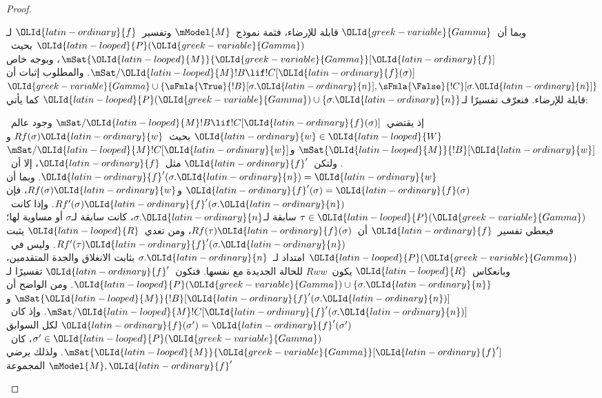 \documentclass[../../../include/open-logic-section]{subfiles}
\begin{document}
\begin{proof}
\begin{enumerate}
  وبما أن~$\OLId{greek-variable}{Gamma}$ قابلة للإرضاء، فثمة نموذج~$\mModel{M}$ وتفسير~$\OLId{latin-ordinary}{f}$
  لـ$\OLId{latin-looped}{P}(\OLId{greek-variable}{Gamma})$ بحيث~$\mSat{\OLId{latin-looped}{M}}{\OLId{greek-variable}{Gamma}}[\OLId{latin-ordinary}{f}]$، وبوجه خاص
  $\mSat/{\OLId{latin-looped}{M}}{!B \lif !C}[\OLId{latin-ordinary}{f}(\sigma)]$. والمطلوب إثبات أن
  $\OLId{greek-variable}{Gamma} \cup \{\sFmla{\True}{!B}[\sigma.\OLId{latin-ordinary}{n}],
  \sFmla{\False}{!C}[\sigma.\OLId{latin-ordinary}{n}]\}$ قابلة للإرضاء. فنعرّف
  تفسيرًا لـ$\OLId{latin-looped}{P}(\OLId{greek-variable}{Gamma}) \cup \{\sigma.\OLId{latin-ordinary}{n}\}$ كما يأتي:

  إذ يقتضي~$\mSat/{\OLId{latin-looped}{M}}{!B \lif !C}[\OLId{latin-ordinary}{f}(\sigma)]$ وجود عالم~$\OLId{latin-ordinary}{w} \in \OLId{latin-looped}{W}$
  بحيث~$Rf(\sigma)\OLId{latin-ordinary}{w}$ و$\mSat{\OLId{latin-looped}{M}}{!B}[\OLId{latin-ordinary}{w}]$ و$\mSat/{\OLId{latin-looped}{M}}{!C}[\OLId{latin-ordinary}{w}]$.
  ولتكن~$\OLId{latin-ordinary}{f}'$ مثل~$\OLId{latin-ordinary}{f}$، إلا أن~$\OLId{latin-ordinary}{f}'(\sigma.\OLId{latin-ordinary}{n}) = \OLId{latin-ordinary}{w}$. وبما أن
  $\OLId{latin-ordinary}{f}'(\sigma) = \OLId{latin-ordinary}{f}(\sigma)$ و$Rf(\sigma)\OLId{latin-ordinary}{w}$، فإن
  $Rf'(\sigma)\OLId{latin-ordinary}{f}'(\sigma.\OLId{latin-ordinary}{n})$. وإذا كانت~$\tau\in \OLId{latin-looped}{P}(\OLId{greek-variable}{Gamma})$ سابقة
  لـ$\sigma.\OLId{latin-ordinary}{n}$، كانت سابقة لـ$\sigma$ أو مساوية لها؛ فيعطي تفسير~$\OLId{latin-ordinary}{f}$
  أن~$Rf(\tau)\OLId{latin-ordinary}{f}(\sigma)$، ومن تعدي~$\OLId{latin-looped}{R}$ يثبت
  $Rf'(\tau)\OLId{latin-ordinary}{f}'(\sigma.\OLId{latin-ordinary}{n})$. وليس في~$\OLId{latin-looped}{P}(\OLId{greek-variable}{Gamma})$ امتداد لـ~$\sigma.\OLId{latin-ordinary}{n}$
  بثابت الانغلاق والجدة المتقدمين، وبانعكاس~$\OLId{latin-looped}{R}$ يكون~$Rww$ للحالة
  الجديدة مع نفسها. فتكون~$\OLId{latin-ordinary}{f}'$ تفسيرًا لـ
  $\OLId{latin-looped}{P}(\OLId{greek-variable}{Gamma}) \cup \{\sigma.\OLId{latin-ordinary}{n}\}$. ومن الواضح أن
  $\mSat{\OLId{latin-looped}{M}}{!B}[\OLId{latin-ordinary}{f}'(\sigma.\OLId{latin-ordinary}{n})]$ و$\mSat/{\OLId{latin-looped}{M}}{!C}[\OLId{latin-ordinary}{f}'(\sigma.\OLId{latin-ordinary}{n})]$.
  وإذ كان~$\OLId{latin-ordinary}{f}(\sigma') = \OLId{latin-ordinary}{f}'(\sigma')$ لكل السوابق
  $\sigma' \in \OLId{latin-looped}{P}(\OLId{greek-variable}{Gamma})$، كان~$\mSat{\OLId{latin-looped}{M}}{\OLId{greek-variable}{Gamma}}[\OLId{latin-ordinary}{f}']$. ولذلك يرضي
  $\mModel{M}, \OLId{latin-ordinary}{f}'$ المجموعة

\end{enumerate}
\end{proof}
\end{document}
